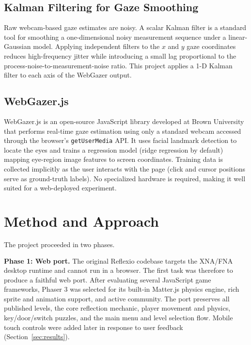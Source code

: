 \documentclass[11pt,twocolumn]{article}
\begin{document}
\subsection{Kalman Filtering for Gaze Smoothing}

Raw webcam-based gaze estimates are noisy. A scalar Kalman filter
\cite{kalman1960} is a standard tool for smoothing a one-dimensional noisy
measurement sequence under a linear-Gaussian model. Applying independent
filters to the $x$ and $y$ gaze coordinates reduces high-frequency jitter
while introducing a small lag proportional to the process-noise-to-measurement-noise
ratio. This project applies a 1-D Kalman filter to each axis of the WebGazer
output.

\subsection{WebGazer.js}

WebGazer.js \cite{webgazer} is an open-source JavaScript library developed at
Brown University that performs real-time gaze estimation using only a standard
webcam accessed through the browser's \texttt{getUserMedia} API. It uses facial
landmark detection to locate the eyes and trains a regression model (ridge
regression by default) mapping eye-region image features to screen coordinates.
Training data is collected implicitly as the user interacts with the page
(click and cursor positions serve as ground-truth labels). No specialized
hardware is required, making it well suited for a web-deployed experiment.

\section{Method and Approach}

The project proceeded in two phases.

\textbf{Phase 1: Web port.} The original Reflexio codebase targets the
XNA/FNA desktop runtime and cannot run in a browser. The first task was
therefore to produce a faithful web port. After evaluating several JavaScript
game frameworks, Phaser 3 \cite{phaser} was selected for its built-in Matter.js
physics engine, rich sprite and animation support, and active community. The
port preserves all published levels, the core reflection mechanic, player
movement and physics, key/door/switch puzzles, and the main menu and level
selection flow. Mobile touch controls were added later in response to user
feedback (Section~\ref{sec:results}).
\end{document}

